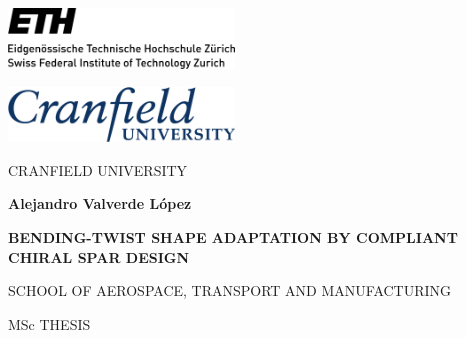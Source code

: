 



\thispagestyle{empty}

\vspace{-20mm}

\Large 
\begin{center}



\begin{minipage}[t]{0.4\textwidth}
	\includegraphics[width=6.0cm]{figures/logos_ETH/eth_logo}
\end{minipage}
\qquad \qquad
\begin{minipage}[t]{0.4\textwidth}
	\includegraphics[width=6.0cm]{figures/logos_Cranfield/Cranfield_logo_blue}
\end{minipage}

\vspace{10mm}

CRANFIELD UNIVERSITY

\vspace{30mm}

\LARGE \textbf{Alejandro Valverde L\'opez}

\vspace{25mm}

\textbf{BENDING-TWIST SHAPE ADAPTATION BY COMPLIANT CHIRAL SPAR DESIGN}

\vspace{35mm}

\Large SCHOOL OF AEROSPACE, TRANSPORT AND MANUFACTURING

\vspace{10mm}

MSc THESIS

\end{center} \normalsize

